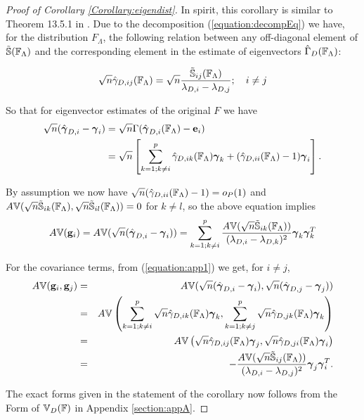 \begin{proof}[Proof of Corollary \ref{Corollary:eigendist}]
In spirit, this corollary is similar to Theorem 13.5.1 in \cite{anderson}. Due to the decomposition (\ref{equation:decompEq}) we have, for the distribution $F_\Lambda$, the following relation between any off-diagonal element of $\tilde {{\mathbb{S}}} ({\mathbb{F}}_\Lambda)$ and the corresponding element in the estimate of eigenvectors $\hat\Gamma_D ({\mathbb{F}}_\Lambda)$:

$$ \sqrt n \hat\gamma_{D,ij} ({\mathbb{F}}_\Lambda) = \sqrt n \frac{\tilde {{\mathbb{S}}}_{ij} ({\mathbb{F}}_\Lambda)}{\lambda_{D,i} - \lambda_{D,j}}; \quad i \neq j$$

So that for eigenvector estimates of the original $F$ we have
%
\begin{align}
\sqrt n (\hat{{\boldsymbol{\gamma}}}_{D,i} - {\boldsymbol{\gamma}}_i) &= \sqrt n \Gamma (\hat {{\boldsymbol{\gamma}}}_{D,i}({\mathbb{F}}_\Lambda) - {\bf{e}}_i )\notag\\
&= \sqrt n \left[ \sum_{k=1; k \neq i}^p \hat \gamma_{D,ik}({\mathbb{F}}_\Lambda ){\boldsymbol{\gamma}}_k + (\hat \gamma_{D,ii}({\mathbb{F}}_\Lambda) - 1){\boldsymbol{\gamma}}_i \right].\label{equation:app1}
\end{align}

By assumption we now have $\sqrt n (\hat \gamma_{D,ii}({\mathbb{F}}_\Lambda) - 1) =  o_P(1)$ and $A{\mathbb{V}}( \sqrt n \tilde {{\mathbb{S}}}_{ik}({\mathbb{F}}_\Lambda), \sqrt n \tilde {{\mathbb{S}}}_{il}({\mathbb{F}}_\Lambda)) = 0$ for $k \neq l$, so the above equation implies
%
$$
A{\mathbb{V}}({\bf{g}}_i) = A{\mathbb{V}} (\sqrt n (\hat{{\boldsymbol{\gamma}}}_{D,i} - {\boldsymbol{\gamma}}_i)) =
\sum_{k=1; k \neq i}^p \frac{A{\mathbb{V}}(\sqrt n \tilde {{\mathbb{S}}}_{ik}({\mathbb{F}}_\Lambda))}{(\lambda_{D,i} - \lambda_{D,k})^2} {\boldsymbol{\gamma}}_k {\boldsymbol{\gamma}}_k^T
$$

For the covariance terms, from (\ref{equation:app1}) we get, for $i \neq j$,
%
\begin{eqnarray*}
A{\mathbb{V}}( {\bf{g}}_i, {\bf{g}}_j) &=& A{\mathbb{V}} (\sqrt n (\hat{{\boldsymbol{\gamma}}}_{D,i} - {\boldsymbol{\gamma}}_i), \sqrt n (\hat{{\boldsymbol{\gamma}}}_{D,j} - {\boldsymbol{\gamma}}_j))\\
&=& A{\mathbb{V}} \left( \sum_{k=1; k \neq i}^p \sqrt n \hat \gamma_{D,ik}({\mathbb{F}}_\Lambda){\boldsymbol{\gamma}}_k, \sum_{k=1; k \neq j}^p \sqrt n \hat \gamma_{D,jk}({\mathbb{F}}_\Lambda){\boldsymbol{\gamma}}_k \right)\\
&=& A{\mathbb{V}} \left( \sqrt n \hat \gamma_{D,ij}({\mathbb{F}}_\Lambda){\boldsymbol{\gamma}}_j, \sqrt n \hat \gamma_{D,ji}({\mathbb{F}}_\Lambda){\boldsymbol{\gamma}}_i \right)\\
&=& - \frac{A{\mathbb{V}}( \sqrt n \tilde {{\mathbb{S}}}_{ij}({\mathbb{F}}_\Lambda))}{(\lambda_{D,i} - \lambda_{D,j})^2} {\boldsymbol{\gamma}}_j {\boldsymbol{\gamma}}_i^T.
\end{eqnarray*}

The exact forms given in the statement of the corollary now follows from the  Form of ${\mathbb{V}}_D ({\mathbb{F}})$ in Appendix \ref{section:appA}.


\end{proof}
